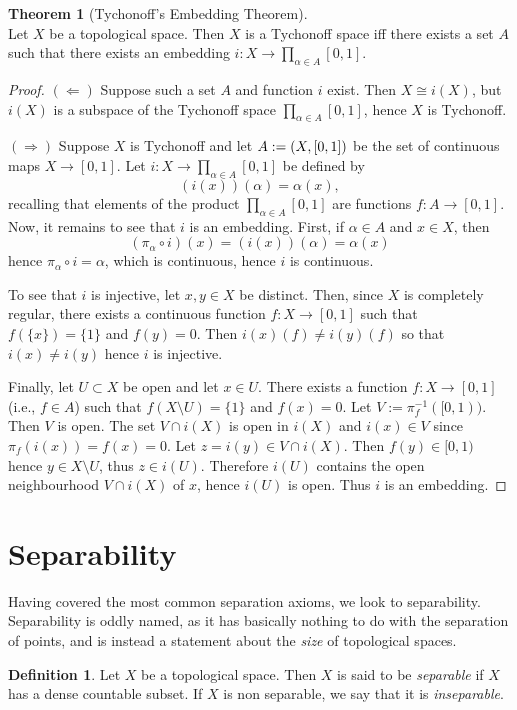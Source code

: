 \documentclass{book}
\theoremstyle{definition}
\newtheorem{theorem}{Theorem}[section]
\newtheorem{definition}{Definition}[section]
\theoremstyle{remark}
\let\hom\relax
\DeclareMathOperator{\hom}{Hom}
\begin{document}
\begin{theorem}[Tychonoff's Embedding Theorem]$ $\\
Let $X$ be a topological space. Then $X$ is a Tychonoff space iff there exists a set $A$ such that there exists an embedding $i:X\to\prod_{\alpha\in A}[0,1]$.
\end{theorem}
\begin{proof}
$(\Leftarrow)$ Suppose such a set $A$ and function $i$ exist. Then $X\cong i(X)$, but $i(X)$ is a subspace of the Tychonoff space $\prod_{\alpha\in A}[0,1]$, hence $X$ is Tychonoff.

$(\Rightarrow)$ Suppose $X$ is Tychonoff and let $A:=\hom(X,[0,1])$ be the set of continuous maps $X\to[0,1]$. Let $i:X\to\prod_{\alpha\in A}[0,1]$ be defined by
$$(i(x))(\alpha)=\alpha(x),$$
recalling that elements of the product $\prod_{\alpha\in A}[0,1]$ are functions $f:A\to[0,1]$. Now, it remains to see that $i$ is an embedding. First, if $\alpha\in A$ and $x\in X$, then
$$(\pi_\alpha\circ i)(x)=(i(x))(\alpha)=\alpha(x)$$
hence $\pi_\alpha\circ i=\alpha$, which is continuous, hence $i$ is continuous.

To see that $i$ is injective, let $x,y\in X$ be distinct. Then,  since $X$ is completely regular, there exists a continuous function $f:X\to[0,1]$ such that $f(\{x\})=\{1\}$ and $f(y)=0$. Then $i(x)(f)\neq i(y)(f)$ so that $i(x)\neq i(y)$ hence $i$ is injective.

Finally, let $U\subset X$ be open and let $x\in U$. There exists a function $f:X\to[0,1]$ (i.e., $f\in A$) such that $f(X\setminus U)=\{1\}$ and $f(x)=0$. Let $V:=\pi_f^{-1}([0,1))$. Then $V$ is open. The set $V\cap i(X)$ is open in $i(X)$ and $i(x)\in V$ since $\pi_f(i(x))=f(x)=0$. Let $z=i(y)\in V\cap i(X)$. Then $f(y)\in[0,1)$ hence $y\in X\setminus U$, thus $z\in i(U)$. Therefore $i(U)$ contains the open neighbourhood $V\cap i(X)$ of $x$, hence $i(U)$ is open. Thus $i$ is an embedding.
\end{proof}

\section{Separability}
Having covered the most common separation axioms, we look to separability. Separability is oddly named, as it has basically nothing to do with the separation of points, and is instead a statement about the \textit{size} of topological spaces.

\begin{definition}
Let $X$ be a topological space. Then $X$ is said to be \textit{separable} if $X$ has a dense countable subset. If $X$ is non separable, we say that it is \textit{inseparable}.
\end{definition}
\end{document}
